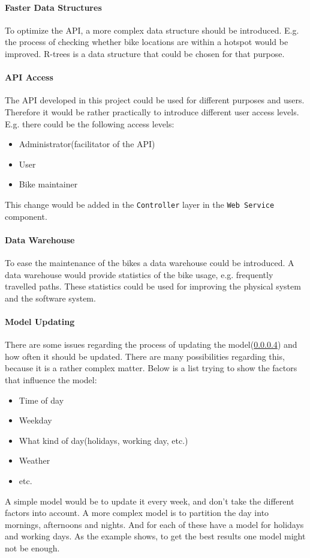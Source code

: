 \paragraph{Faster Data Structures}
To optimize the API, a more complex data structure should be introduced.
E.g. the process of checking whether bike locations are within a hotspot would be improved.
R-trees\cite[Section 25.3.5.3]{database_system_concepts} is a data structure that could be chosen for that purpose.

\paragraph{API Access}
The API developed in this project could be used for different purposes and users.
Therefore it would be rather practically to introduce different user access levels.
E.g. there could be the following access levels:
\begin{itemize}
\item Administrator(facilitator of the API)
\item User
\item Bike maintainer
\end{itemize}
This change would be added in the \texttt{Controller} layer in the \texttt{Web Service} component.

\paragraph{Data Warehouse \cite{data_warehousing}}
To ease the maintenance of the bikes a data warehouse could be introduced.
A data warehouse would provide statistics of the bike usage, e.g. frequently travelled paths.
These statistics could be used for improving the physical system and the software system.

\paragraph{Model Updating}
There are some issues regarding the process of updating the model(\cref{}) and how often it should be updated.
There are many possibilities regarding this, because it is a rather complex matter.
Below is a list trying to show the factors that influence the model:
\begin{itemize}
\item Time of day
\item Weekday
\item What kind of day(holidays, working day, etc.)
\item Weather
\item etc.
\end{itemize}
A simple model would be to update it every week, and don't take the different factors into account.
A more complex model is to partition the day into mornings, afternoons and nights.
And for each of these have a model for holidays and working days.
As the example shows, to get the best results one model might not be enough.

